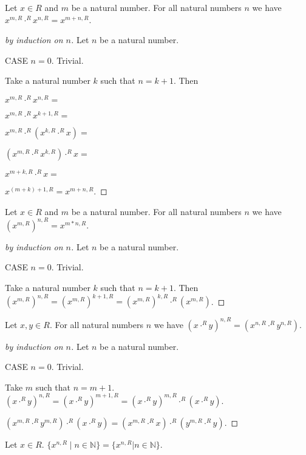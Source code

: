 \documentclass[11pt]{article}
\newcommand{\powers}[2]{\{{#1}^{n,#2} \mid n \in \mathbb{N}\}}
\begin{document}
\begin{forthel}
\begin{lemma} Let $x \in R$ and $m$ be a natural number.
For all natural numbers $n$
we have
$x^{m,R} \cdot^{R} x^{n,R} = x^{m + n,R}$.
\end{lemma}
\begin{proof}[by induction on $n$]
Let $n$ be a natural number.

CASE $n = 0$. Trivial.

Take a natural number $k$ such that $n = k + 1$.
Then

$x^{m,R} \cdot^{R} x^{n,R} = $

$x^{m,R} \cdot^{R} x^{k+1,R} = $

$x^{m,R} \cdot^{R} (x^{k,R} \cdot^{R} x) = $

$(x^{m,R} \cdot^{R} x^{k,R}) \cdot^{R} x = $

$x^{m + k,R} \cdot^{R} x = $

$x^{(m + k)+1,R} = x^{m+n,R}.$
\end{proof}

\begin{lemma} Let $x \in R$ and $m$ be a natural number.
For all natural numbers $n$
we have
$(x^{m,R})^{n,R} = x^{m * n,R}$.
\end{lemma}
\begin{proof}[by induction on $n$]
Let $n$ be a natural number.

CASE $n = 0$. Trivial.

Take a natural number $k$ such that $n = k + 1$. Then
$(x^{m,R})^{n,R} =
(x^{m,R})^{k+1,R} =
(x^{m,R})^{k,R} \cdot^{R} (x^{m,R})$.
\end{proof}

\begin{lemma} Let $x,y \in R$. For all natural numbers
$n$ we have
$(x \cdot^{R} y)^{n,R} = (x^{n,R} \cdot^{R} y^{n,R})$.
\end{lemma}
\begin{proof}[by induction on $n$]
Let $n$ be a natural number.

CASE $n = 0$. Trivial.

Take $m$ such that $n = m + 1$.
$(x \cdot^{R} y)^{n,R} =
(x \cdot^{R} y)^{m+1,R} =
(x \cdot^{R} y)^{m,R} \cdot^{R} (x \cdot^{R} y).$

$(x^{m,R} \cdot^{R} y^{m,R}) \cdot^{R} (x \cdot^{R} y) =
(x^{m,R} \cdot^{R} x) \cdot^{R} ( y^{m,R} \cdot^{R} y)$.
\end{proof}

\begin{definition} Let $x \in R$. $\powers{x}{R} = \{x^{n,R} | n \in \mathbb{N} \} $.
\end{definition}


\end{forthel}
\end{document}
